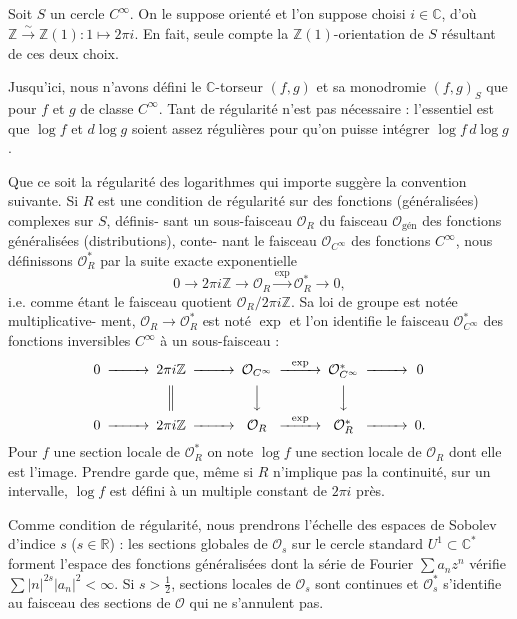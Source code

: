 \documentclass[12pt,a4paper]{article}
\theoremstyle{plain}
\theoremstyle{definition}
\theoremstyle{remark}
\newcommand{\cO}{\mathcal{O}}
\newcommand{\Z}{\mathbb{Z}}
\newcommand{\C}{\mathbb{C}}
\newcommand{\R}{\mathbb{R}}
\providecommand{\cO}{\mathcal{O}}
\providecommand{\R}{\mathrm{R}}
\begin{document}
\subsection{}

Soit $S$ un cercle $C^\infty$. On le suppose orienté et l'on suppose choisi $i \in \C$, d'où
$\Z \xrightarrow{\sim} \Z(1) : 1 \mapsto 2\pi i$. En fait, seule compte la $\Z(1)$-orientation de $S$ résultant de ces
deux choix.

Jusqu'ici, nous n'avons défini le $\C$-torseur $(f,g)$ et sa monodromie $(f,g)_S$ que
pour $f$ et $g$ de classe $C^\infty$. Tant de régularité n'est pas nécessaire : l'essentiel est que $\log f$
et $d\log g$ soient assez régulières pour qu'on puisse intégrer $\log f \, d\log g$.

Que ce soit la régularité des logarithmes qui importe suggère la convention suivante.
Si $R$ est une condition de régularité sur des fonctions (généralisées) complexes sur $S$, définis-
sant un sous-faisceau $\cO_R$ du faisceau $\cO_{\text{gén}}$ des fonctions généralisées (distributions), conte-
nant le faisceau $\cO_{C^\infty}$ des fonctions $C^\infty$, nous définissons $\cO_R^*$ par la suite exacte exponentielle
\[
0 \to 2\pi i\Z \to \cO_R \xrightarrow{\exp} \cO_R^* \to 0,
\]
i.e. comme étant le faisceau quotient $\cO_R / 2\pi i\Z$. Sa loi de groupe est notée multiplicative-
ment, $\cO_R \to \cO_R^*$ est noté $\exp$ et l'on identifie le faisceau $\cO_{C^\infty}^*$ des fonctions inversibles $C^\infty$
à un sous-faisceau :
\[
\begin{CD}
0 @>>> 2\pi i\Z @>>> \cO_{C^\infty} @>{\exp}>> \cO_{C^\infty}^* @>>> 0 \\
@. @| @VVV @VVV \\
0 @>>> 2\pi i\Z @>>> \cO_R @>{\exp}>> \cO_R^* @>>> 0.
\end{CD}
\]
Pour $f$ une section locale de $\cO_R^*$ on note $\log f$ une section locale de $\cO_R$ dont elle est l'image.
Prendre garde que, même si $R$ n'implique pas la continuité, sur un intervalle, $\log f$
est défini à un multiple constant de $2\pi i$ près.

Comme condition de régularité, nous prendrons l'échelle des espaces de Sobolev
d'indice $s$ ($s \in \R$) : les sections globales de $\cO_s$ sur le cercle standard $U^1 \subset \C^*$ forment
l'espace des fonctions généralisées dont la série de Fourier $\sum a_n z^n$ vérifie $\sum |n|^{2s} |a_n|^2 < \infty$.
Si $s > \tfrac{1}{2}$, sections locales de $\cO_s$ sont continues et $\cO_s^*$ s'identifie au faisceau des sections
de $\cO$ qui ne s'annulent pas.
\end{document}
